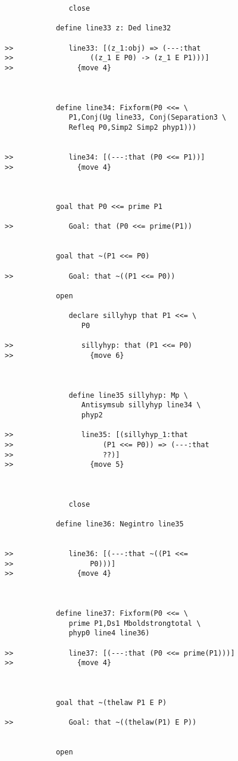 \documentclass[12pt]{article}
\begin{document}
\begin{verbatim}
               close

            define line33 z: Ded line32

>>             line33: [(z_1:obj) => (---:that
>>                  ((z_1 E P0) -> (z_1 E P1)))]
>>               {move 4}



            define line34: Fixform(P0 <<= \
               P1,Conj(Ug line33, Conj(Separation3 \
               Refleq P0,Simp2 Simp2 phyp1)))


>>             line34: [(---:that (P0 <<= P1))]
>>               {move 4}



            goal that P0 <<= prime P1

>>             Goal: that (P0 <<= prime(P1))


            goal that ~(P1 <<= P0)

>>             Goal: that ~((P1 <<= P0))

            open

               declare sillyhyp that P1 <<= \
                  P0

>>                sillyhyp: that (P1 <<= P0)
>>                  {move 6}



               define line35 sillyhyp: Mp \
                  Antisymsub sillyhyp line34 \
                  phyp2

>>                line35: [(sillyhyp_1:that
>>                     (P1 <<= P0)) => (---:that
>>                     ??)]
>>                  {move 5}



               close

            define line36: Negintro line35


>>             line36: [(---:that ~((P1 <<=
>>                  P0)))]
>>               {move 4}



            define line37: Fixform(P0 <<= \
               prime P1,Ds1 Mboldstrongtotal \
               phyp0 line4 line36)

>>             line37: [(---:that (P0 <<= prime(P1)))]
>>               {move 4}



            goal that ~(thelaw P1 E P)

>>             Goal: that ~((thelaw(P1) E P))


            open


\end{verbatim}
\end{document}
